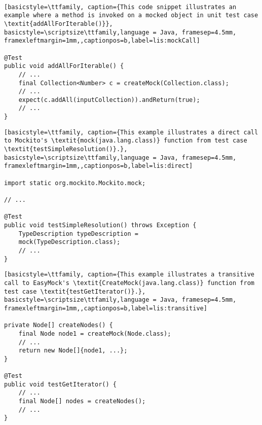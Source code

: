 ‎

\begin{lstlisting}[basicstyle=\ttfamily, caption={This code snippet illustrates an example where a method is invoked on a mocked object in unit test case \textit{addAllForIterable()}},
basicstyle=\scriptsize\ttfamily,language = Java, framesep=4.5mm,
framexleftmargin=1mm,,captionpos=b,label=lis:mockCall]

@Test
public void addAllForIterable() {
	// ...
	final Collection<Number> c = createMock(Collection.class);
	// ...
	expect(c.addAll(inputCollection)).andReturn(true);
	// ...
}

\end{lstlisting}

\begin{lstlisting}[basicstyle=\ttfamily, caption={This example illustrates a direct call to Mockito's \textit{mock(java.lang.class)} function from test case \textit{testSimpleResolution()}.},
basicstyle=\scriptsize\ttfamily,language = Java, framesep=4.5mm,
framexleftmargin=1mm,,captionpos=b,label=lis:direct]

import static org.mockito.Mockito.mock;

// ...

@Test
public void testSimpleResolution() throws Exception {
	TypeDescription typeDescription = 
	mock(TypeDescription.class);
	// ...
}

\end{lstlisting}

\begin{lstlisting}[basicstyle=\ttfamily, caption={This example illustrates a transitive call to EasyMock's \textit{CreateMock(java.lang.class)} function from test case \textit{testGetIterator()}.},
basicstyle=\scriptsize\ttfamily,language = Java, framesep=4.5mm,
framexleftmargin=1mm,,captionpos=b,label=lis:transitive]

private Node[] createNodes() {
	final Node node1 = createMock(Node.class);
	// ...
	return new Node[]{node1, ...};
}

@Test
public void testGetIterator() {
	// ...
	final Node[] nodes = createNodes();
	// ...
}

\end{lstlisting}
